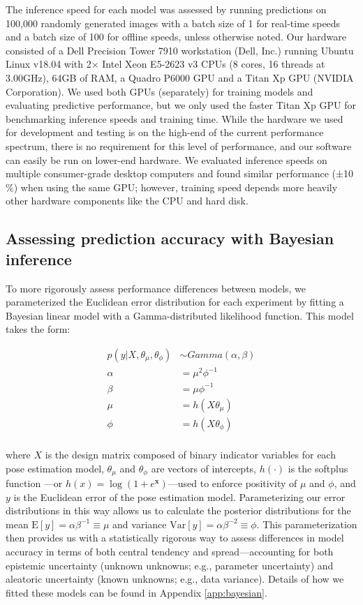 \documentclass[11pt,a4paper,oneside]{book}
\begin{document}
The inference speed for each model was assessed by running predictions on 100,000 randomly generated images with a batch size of 1 for real-time speeds and a batch size of 100 for offline speeds, unless otherwise noted. Our hardware consisted of a Dell Precision Tower 7910 workstation (Dell, Inc.) running Ubuntu Linux v18.04 with 2$\times$ Intel Xeon E5-2623 v3 CPUs (8 cores, 16 threads at 3.00GHz), 64GB of RAM, a Quadro P6000 GPU and a Titan Xp GPU (NVIDIA Corporation). We used both GPUs (separately) for training models and evaluating predictive performance, but we only used the faster Titan Xp GPU for benchmarking inference speeds and training time. While the hardware we used for development and testing is on the high-end of the current performance spectrum, there is no requirement for this level of performance, and our software can easily be run on lower-end hardware. We evaluated inference speeds on multiple consumer-grade desktop computers and found similar performance (±10$\%$) when using the same GPU; however, training speed depends more heavily other hardware components like the CPU and hard disk. 

\subsection{Assessing prediction accuracy with Bayesian inference}
To more rigorously assess performance differences between models, we parameterized the Euclidean error distribution for each experiment by fitting a Bayesian linear model with a Gamma-distributed likelihood function. This model takes the form:

\begin{align*}
p(y|X,\theta_{\mu},\theta_{\phi}) &\sim Gamma(\alpha, \beta)\\
\alpha &= \mu^{2}\phi^{-1}\\
\beta &= \mu\phi^{-1}\\
\mu &= h(X\theta_{\mu})\\
\phi &= h(X\theta_{\phi})\\
\end{align*}

where $X$ is the design matrix composed of binary indicator variables for each pose estimation model, $\theta_{\mu}$ and $\theta_{\phi}$ are vectors of intercepts, $h(\cdot)$ is the softplus function \citep{dugas2001incorporating}—or $h(x) = \log{(1+e^{\mathbf{x}})}$—used to enforce positivity of $\mu$ and $\phi$, and $y$ is the Euclidean error of the pose estimation model. Parameterizing our error distributions in this way allows us to calculate the posterior distributions for the mean $\mathrm{E}[y] = \alpha\beta^{-1} \equiv \mu$ and variance $\mathrm{Var}[y] = \alpha\beta^{-2} \equiv \phi$. This parameterization then provides us with a statistically rigorous way to assess differences in model accuracy in terms of both central tendency and spread—accounting for both epistemic uncertainty (unknown unknowns; e.g., parameter uncertainty) and aleatoric uncertainty (known unknowns; e.g., data variance). Details of how we fitted these models can be found in Appendix \ref{app:bayesian}.
\end{document}
